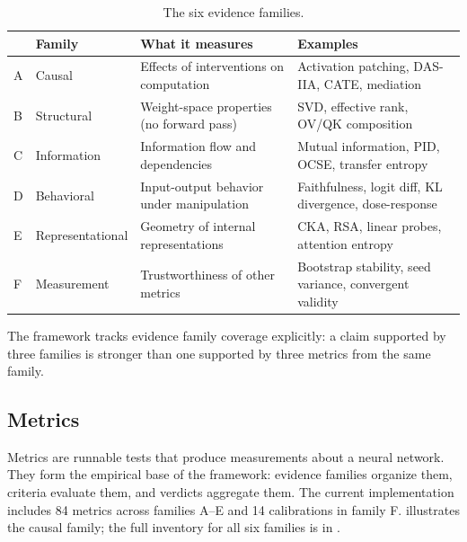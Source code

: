 \documentclass[10pt]{article}
\begin{document}
\begin{table}[H]
\centering
\small
\caption{The six evidence families.}
\label{tab:families}
\renewcommand{\arraystretch}{1.2}
\begin{tabular}{@{}ll>{\raggedright\arraybackslash}p{4.5cm}>{\raggedright\arraybackslash}p{5cm}@{}}
\toprule
& \textbf{Family} & \textbf{What it measures} & \textbf{Examples} \\
\midrule
A & Causal & Effects of interventions on computation & Activation patching, DAS-IIA, CATE, mediation \\
\midrule
B & Structural & Weight-space properties (no forward pass) & SVD, effective rank, OV/QK composition \\
\midrule
C & Information & Information flow and dependencies & Mutual information, PID, OCSE, transfer entropy \\
\midrule
D & Behavioral & Input-output behavior under manipulation & Faithfulness, logit diff, KL divergence, dose-response \\
\midrule
E & Representational & Geometry of internal representations & CKA, RSA, linear probes, attention entropy \\
\midrule
F & Measurement & Trustworthiness of other metrics & Bootstrap stability, seed variance, convergent validity \\
\bottomrule
\end{tabular}
\end{table}

The framework tracks evidence family coverage explicitly: a claim supported by three families is stronger than one supported by three metrics from the same family.

\subsection{Metrics}
\label{sec:metrics}

Metrics are runnable tests that produce measurements about a neural network. They form the empirical base of the framework: evidence families organize them, criteria evaluate them, and verdicts aggregate them. The current implementation includes 84 metrics across families A--E and 14 calibrations in family F.  illustrates the causal family; the full inventory for all six families is in .
\end{document}
